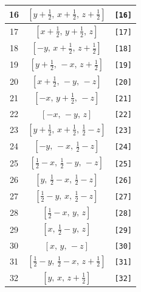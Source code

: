 \documentclass[fleqn,8pt]{jsarticle}
\begin{document}
\begin{longtable}{ccc}
16 & $\left[ y + \frac{1}{2},\, x + \frac{1}{2},\, z + \frac{1}{2} \right]$ & {\tt [16]} \\ \hline
17 & $\left[ x + \frac{1}{2},\, y + \frac{1}{2},\, z \right]$ & {\tt [17]} \\ \hline
18 & $\left[ - y,\, x + \frac{1}{2},\, z + \frac{1}{2} \right]$ & {\tt [18]} \\ \hline
19 & $\left[ y + \frac{1}{2},\, - x,\, z + \frac{1}{2} \right]$ & {\tt [19]} \\ \hline
20 & $\left[ x + \frac{1}{2},\, - y,\, - z \right]$ & {\tt [20]} \\ \hline
21 & $\left[ - x,\, y + \frac{1}{2},\, - z \right]$ & {\tt [21]} \\ \hline
22 & $\left[ - x,\, - y,\, z \right]$ & {\tt [22]} \\ \hline
23 & $\left[ y + \frac{1}{2},\, x + \frac{1}{2},\, \frac{1}{2} - z \right]$ & {\tt [23]} \\ \hline
24 & $\left[ - y,\, - x,\, \frac{1}{2} - z \right]$ & {\tt [24]} \\ \hline
25 & $\left[ \frac{1}{2} - x,\, \frac{1}{2} - y,\, - z \right]$ & {\tt [25]} \\ \hline
26 & $\left[ y,\, \frac{1}{2} - x,\, \frac{1}{2} - z \right]$ & {\tt [26]} \\ \hline
27 & $\left[ \frac{1}{2} - y,\, x,\, \frac{1}{2} - z \right]$ & {\tt [27]} \\ \hline
28 & $\left[ \frac{1}{2} - x,\, y,\, z \right]$ & {\tt [28]} \\ \hline
29 & $\left[ x,\, \frac{1}{2} - y,\, z \right]$ & {\tt [29]} \\ \hline
30 & $\left[ x,\, y,\, - z \right]$ & {\tt [30]} \\ \hline
31 & $\left[ \frac{1}{2} - y,\, \frac{1}{2} - x,\, z + \frac{1}{2} \right]$ & {\tt [31]} \\ \hline
32 & $\left[ y,\, x,\, z + \frac{1}{2} \right]$ & {\tt [32]} \\
\end{longtable}
\end{document}
